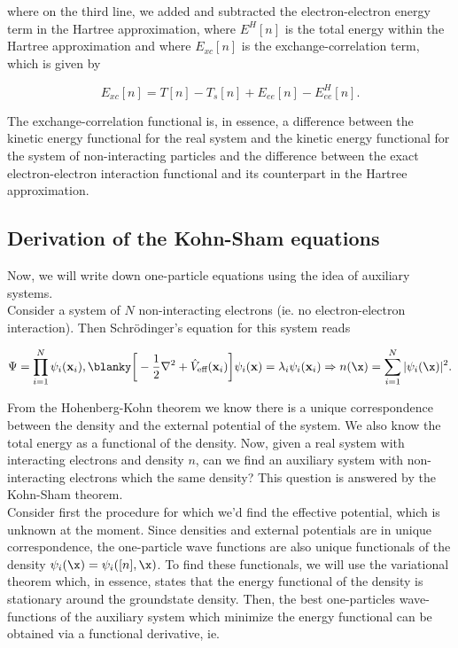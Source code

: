 \documentclass{homework}
\begin{document}
where on the third line, we added and subtracted the electron-electron energy term in the Hartree approximation, where $E^H[n]$ is the total energy within the Hartree approximation and where $ E_{xc}[n]$ is the exchange-correlation term, which is given by

$$
 E_{xc}[n] = T[n] - T_s[n] + E_{ee}[n] - E^H_{ee} [n].
$$

The exchange-correlation functional is, in essence, a difference between the kinetic energy functional for the real system and the kinetic energy functional for the system of non-interacting particles and the difference between the exact electron-electron interaction functional and its counterpart in the Hartree approximation. \\

\subsection{Derivation of the Kohn-Sham equations}

Now, we will write down one-particle equations using the idea of auxiliary systems. \\

Consider a system of $N$ non-interacting electrons (ie. no electron-electron interaction). Then Schr\"odinger's equation for this system reads

$$
\Psi = \prod_{i=1}^{N} \psi_{i}({\bf x}_i), \blanky \bigg[-\frac{1}{2} \nabla^2 + \hat{V}_{\textnormal{eff}}({\bf x}_i) \bigg] \psi_{i} ({\bf x}) = \lambda_i \psi_{i}({\bf x}_i) \Rightarrow n(\x) = \sum_{i=1}^{N} |\psi_i(\x)|^2.
$$

From the Hohenberg-Kohn theorem we know there is a unique correspondence between the density and the external potential of the system. We also know the total energy as a functional of the density. Now, given a real system with interacting electrons and density $n$, can we find an auxiliary system with non-interacting electrons which the same density? This question is answered by the Kohn-Sham theorem. \\

Consider first the procedure for which we'd find the effective potential, which is unknown at the moment. 
Since densities and external potentials are in unique correspondence, the one-particle wave functions are also unique functionals of the density $\psi_i (\x) = \psi_i ([n], \x)$. To find these functionals, we will use the variational theorem which, in essence, states that the energy functional of the density is stationary around the groundstate density. Then, the best one-particles wave-functions of the auxiliary system which minimize the energy functional can be obtained via a functional derivative, ie.
\end{document}
